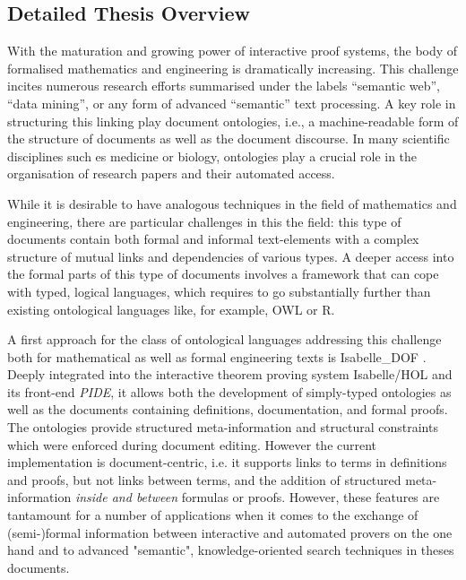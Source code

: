 \documentclass[a4paper,10pt]{article}
\begin{document}
\subsection*{Detailed Thesis Overview}
With the maturation and growing power of interactive proof systems, the body of formalised mathematics and engineering is dramatically increasing.
This  challenge incites numerous research efforts summarised under the labels “semantic web”, “data mining”, or any form of advanced “semantic” text processing. A key role in structuring this linking play document ontologies, i.e., a machine-readable form of the structure of documents as well as the document discourse. In many scientific disciplines such es medicine or biology, ontologies play a crucial role in the organisation of research
papers and their automated access.

While it is desirable to have analogous techniques in the field of mathematics and engineering, there are particular challenges in this the field:
this type of documents contain both formal and informal text-elements with a complex structure of mutual links and dependencies of
various types. A deeper access into the formal parts of this type of documents involves a framework that can cope with typed, logical languages,
which requires to go substantially further than existing ontological languages like, for example, OWL or R\cite{owl2012,protege,owlgred,rontorium}. 

A first approach for the class of ontological languages addressing this challenge both for mathematical as well as formal engineering texts is
Isabelle\_DOF \cite{Brucker-ea.Using-CICM18,BruckerWolff.Design-SEFM19,BruckerWolff.Certif-IFM19}. Deeply integrated into the interactive theorem proving system Isabelle/HOL and its front-end \emph{PIDE}, it allows both the development of simply-typed ontologies as well as the documents containing definitions, documentation, and formal proofs. The ontologies provide structured meta-information and structural constraints which were enforced during document editing. However the current implementation is document-centric, i.e. it supports links to terms in definitions 
and proofs, but not links between terms, and the addition of structured meta-information \emph{inside and between} formulas or proofs. However, these features are tantamount for a number of applications when it comes to the exchange of (semi-)formal information between interactive
and automated provers on the one hand and to advanced "semantic", knowledge-oriented search techniques in theses documents.
\end{document}
